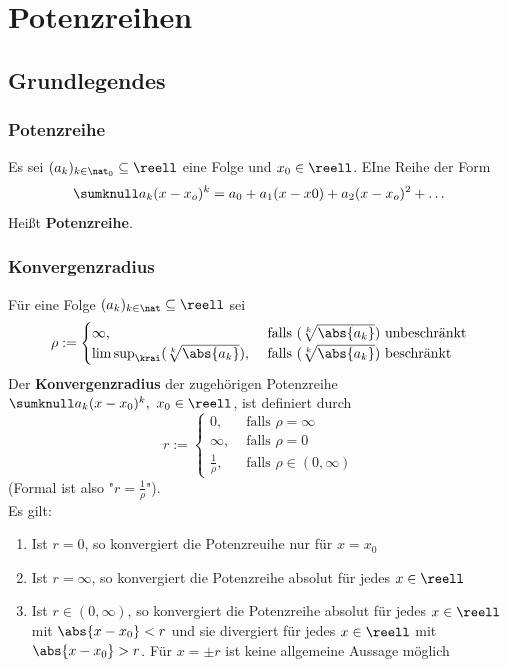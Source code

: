 \documentclass{kit}
\begin{document}
\section{Potenzreihen}
  \subsection{Grundlegendes}
    \subsubsection{Potenzreihe}
      Es sei $(a_k)_{k\in\nat_0}\subseteq\reell$ eine Folge und $x_0\in\reell$. EIne Reihe der Form
      $$\sumknull a_k(x-x_o)^k=a_0+a_1(x-x0)+a_2(x-x_o)^2+\dots$$
      Heißt \textbf{Potenzreihe}.
    \subsubsection{Konvergenzradius}
      Für eine Folge $(a_k)_{k\in\nat}\subseteq\reell$ sei
      $$\rho:=\begin{cases}
        \infty, & \text{ falls }(\sqrt[k]{\abs{a_k}})\text{ unbeschränkt}\\
        \limsup_\krai (\sqrt[k]{\abs{a_k}}), & \text{ falls } (\sqrt[k]{\abs{a_k}})\text{ beschränkt}
      \end{cases}$$
      Der \textbf{Konvergenzradius} der zugehörigen Potenzreihe $\sumknull a_k(x-x_0)^k,\ x_0\in\reell$, ist definiert durch
      $$r:=\begin{cases}
        0, & \text{ falls }\rho=\infty\\
        \infty, & \text{ falls }\rho=0\\
        \frac{1}{\rho}, & \text{ falls }\rho\in(0,\infty)
      \end{cases}$$
      (Formal ist also "$r=\frac{1}{\rho}$").\\
      Es gilt:
      \begin{enumerate}
        \item Ist $r=0$, so konvergiert die Potenzreuihe nur für $x=x_0$
        \item Ist $r=\infty$, so konvergiert die Potenzreihe absolut für jedes $x\in\reell$
        \item Ist $r\in(0,\infty)$, so konvergiert die Potenzreihe absolut für jedes $x\in\reell$ mit $\abs{x-x_0}<r$ und sie divergiert für jedes $x\in\reell$ mit $\abs{x-x_0}>r$. Für $x=\pm r$ ist keine allgemeine Aussage möglich
      \end{enumerate}
\end{document}
